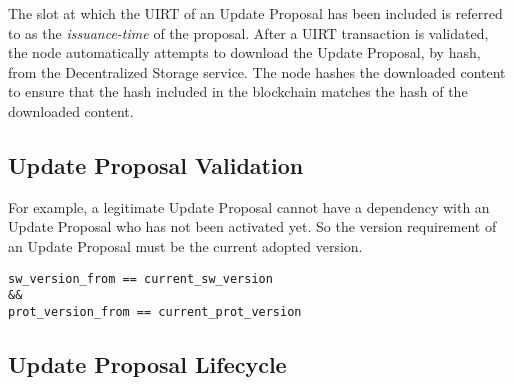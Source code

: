 The slot at which the UIRT of an Update Proposal has been included is referred to as the \emph{issuance-time} of the proposal. After a UIRT transaction is validated, the node automatically attempts to download the Update Proposal, by hash, from the Decentralized Storage service. The node hashes the downloaded content to ensure that the hash included in the blockchain matches the hash of the downloaded content.

\subsection*{Update Proposal Validation}
For example, a legitimate Update Proposal cannot have a dependency with an Update Proposal who has not been activated yet. So the version requirement of an Update Proposal must be the current adopted version.
\begin{verbatim}
sw_version_from == current_sw_version 
&&
prot_version_from == current_prot_version
\end{verbatim}


\subsection*{Update Proposal Lifecycle}
